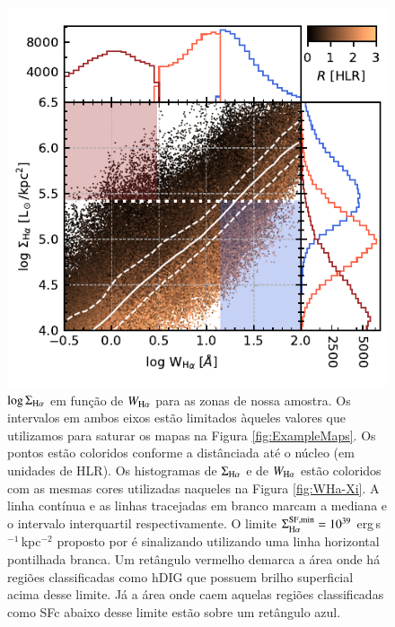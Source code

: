 \begin{figure}
 \includegraphics[scale=1.5]{figuras/fig_logSBHa_logWHa_histograms.pdf}
 \caption[$\log \Sigma_{{\rm H}\alpha} \times \log W_{{\rm H}\alpha}$]
 {$\log \Sigma_{\Ha}$ em função de $W_{\Ha}$ para as zonas de nossa amostra. Os intervalos em ambos eixos estão limitados àqueles valores que utilizamos para saturar os mapas na Figura \ref{fig:ExampleMaps}. Os pontos estão coloridos conforme a distânciada até o núcleo (em unidades de HLR). Os histogramas de $\Sigma_{\Ha}$ e de $W_{\Ha}$ estão coloridos com as mesmas cores utilizadas naqueles na Figura \ref{fig:WHa-Xi}. A linha contínua e as linhas tracejadas em branco marcam a mediana e o intervalo interquartil respectivamente. O limite $\Sigma^{\rm SF,min}_{\Ha} = 10^{39}$ erg$\,$s$^{-1}\,$kpc$^{-2}$ proposto por \citet{Zhang.etal.2017a} é sinalizando utilizando uma linha horizontal pontilhada branca. Um retângulo vermelho demarca a área onde há regiões classificadas como hDIG que possuem brilho superficial acima desse limite. Já a área onde caem aquelas regiões classificadas como SFc abaixo desse limite estão sobre um retângulo azul.}
 \label{fig:logWHa_logSBHa_histo}
\end{figure}

